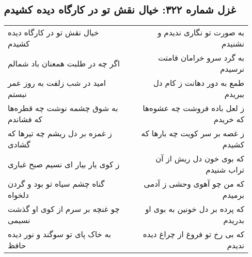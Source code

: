 \begin{center}
\section*{غزل شماره ۳۲۲: خیال نقش تو در کارگاه دیده کشیدم}
\label{sec:sh322}
\begin{longtable}{l p{0.5cm} r}
خیال نقش تو در کارگاه دیده کشیدم
&&
به صورت تو نگاری ندیدم و نشنیدم
\\
اگر چه در طلبت همعنان باد شمالم
&&
به گرد سرو خرامان قامتت نرسیدم
\\
امید در شب زلفت به روز عمر نبستم
&&
طمع به دور دهانت ز کام دل ببریدم
\\
به شوق چشمه نوشت چه قطره‌ها که فشاندم
&&
ز لعل باده فروشت چه عشوه‌ها که خریدم
\\
ز غمزه بر دل ریشم چه تیرها که گشادی
&&
ز غصه بر سر کویت چه بارها که کشیدم
\\
ز کوی یار بیار ای نسیم صبح غباری
&&
که بوی خون دل ریش از آن تراب شنیدم
\\
گناه چشم سیاه تو بود و گردن دلخواه
&&
که من چو آهوی وحشی ز آدمی برمیدم
\\
چو غنچه بر سرم از کوی او گذشت نسیمی
&&
که پرده بر دل خونین به بوی او بدریدم
\\
به خاک پای تو سوگند و نور دیده حافظ
&&
که بی رخ تو فروغ از چراغ دیده ندیدم
\\
\end{longtable}
\end{center}
